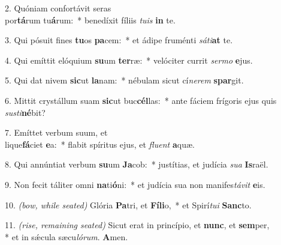 2. Quóniam confortávit seras\\ por\textbf{tá}rum tu\textbf{á}rum:~* benedíxit fíliis \textit{tu}\textit{is} \textbf{in} te.

3. Qui pósuit fines \textbf{tu}os \textbf{pa}cem:~* et ádipe fruménti \textit{sá}\textit{ti}\textbf{at} te.

4. Qui emíttit elóquium \textbf{su}um \textbf{ter}ræ:~* velóciter currit \textit{ser}\textit{mo} \textbf{e}jus.

5. Qui dat nivem \textbf{sic}ut \textbf{la}nam:~* nébulam sicut cí\textit{ne}\textit{rem} \textbf{spar}git.

6. Mittit crystállum suam \textbf{sic}ut buc\textbf{cél}las:~* ante fáciem frígoris ejus quis \textit{sus}\textit{ti}\textbf{né}bit?

7. Emíttet verbum suum, et\\ lique\textbf{fá}ciet \textbf{e}a:~* flabit spíritus ejus, et \textit{flu}\textit{ent} \textbf{a}quæ.

8. Qui annúntiat verbum \textbf{su}um \textbf{Ja}cob:~* justítias, et judícia \textit{su}\textit{a} \textbf{Is}raël.

9. Non fecit táliter omni \textbf{na}ti\textbf{ó}ni:~* et judícia sua non manifes\textit{tá}\textit{vit} \textbf{e}is.

10. {\color{red}\textit{(bow, while seated)}} Glória \textbf{Pa}tri, et \textbf{Fí}\textbf{li}o,~* et Spirí\textit{tu}\textit{i} \textbf{Sanc}to.

11. {\color{red}\textit{(rise, remaining seated)}} Sicut erat in princípio, et \textbf{nunc}, et \textbf{sem}per,\\ * et in s\'{\ae}cula sæcu\textit{ló}\textit{rum}. \textbf{A}men.

